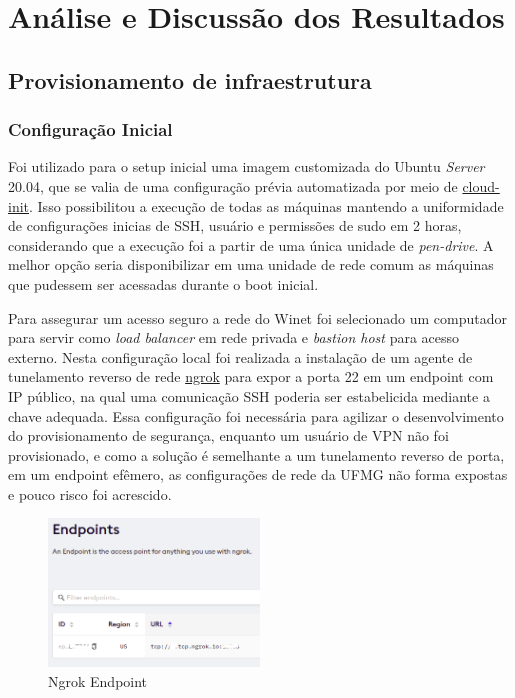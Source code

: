 
\chapter{Análise e Discussão dos Resultados}
\label{chap:resultados}

\section{Provisionamento de infraestrutura}

\subsection{Configuração Inicial}

Foi utilizado para o setup inicial uma imagem customizada do Ubuntu \emph{Server} 20.04, que se valia de uma configuração prévia automatizada por meio de \href{https://cloudinit.readthedocs.io/en/latest/}{cloud-init}. Isso possibilitou a execução de todas as máquinas mantendo a uniformidade de configurações inicias de SSH, usuário e permissões de {sudo} em 2 horas, considerando que a execução foi a partir de uma única unidade de \emph{pen-drive}. A melhor opção seria disponibilizar em uma unidade de rede comum as máquinas que pudessem ser acessadas durante o boot inicial.

Para assegurar um acesso seguro a rede do Winet foi selecionado um computador para servir como \emph{load balancer} em rede privada e \emph{bastion host} para acesso externo. Nesta configuração local foi realizada a instalação de um agente de tunelamento reverso de rede \href{https://ngrok.io}{ngrok} para expor a porta 22 em um endpoint com IP público, na qual uma comunicação SSH poderia ser estabelicida mediante a chave adequada. Essa configuração foi necessária para agilizar o desenvolvimento do provisionamento de segurança, enquanto um usuário de VPN não foi provisionado, e como a solução é semelhante a um tunelamento reverso de porta, em um endpoint efêmero, as configurações de rede da UFMG não forma expostas e pouco risco foi acrescido. 


\begin{figure}[!ht]
    \centering
    \includegraphics[width=0.5\textwidth]{04-figuras/ngrok.png}
    \caption{Ngrok Endpoint}
    \label{fig:ngrok}
\end{figure}

